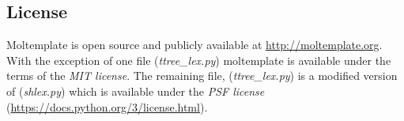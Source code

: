 \documentclass[11pt]{article}
\begin{document}
\subsection*{License}
Moltemplate is open source and publicly available at
\url{http://moltemplate.org}.
With the exception of one file (\textit{ttree\_lex.py}) moltemplate is
available under the terms of the \textit{MIT license}.
The remaining file, (\textit{ttree\_lex.py})
is a modified version of (\textit{shlex.py})
which is available under the
\textit{PSF license}
(\url{https://docs.python.org/3/license.html}).







\end{document}
